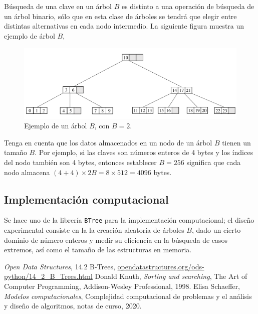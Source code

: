 \documentclass[letterpaper,11pt]{article}
\begin{document}
Búsqueda de una clave en un árbol $B$ es distinto a una operación de búsqueda de un árbol binario, sólo que en esta clase de árboles se tendrá que elegir entre distintas alternativas en cada nodo intermedio. La siguiente figura muestra un ejemplo de árbol $B$,

\begin{figure}[h!]
  \centering
  \includegraphics[width=\textwidth]{img/btree.pdf}
  \caption{Ejemplo de un árbol $B$, con $B=2$.}
  \label{fig:ie}
\end{figure}

Tenga en cuenta que los datos almacenados en un nodo de un árbol $B$ tienen un tamaño $B$. Por ejemplo, si las claves son números enteros de 4 bytes y los índices del nodo también son 4 bytes, entonces establecer $ B=256 $ significa que cada nodo almacena $\displaystyle (4+4)\times 2B= 8\times512=4096$ bytes.

\subsection{Implementación computacional}

Se hace uno de la librería \texttt{BTree} para la implementación computacional; el diseño experimental consiste en la la creación aleatoria de árboles $B$, dado un cierto dominio de número enteros y medir su eficiencia en la búsqueda de casos extremos, así como el tamaño de las estructuras en memoria.
 

\begin{thebibliography}{0}
  \textit{Open Data Structures}, 14.2 B-Trees, \url{opendatastructures.org/ods-python/14_2_B_Trees.html}
   Donald Knuth, \textit{Sorting and searching}, The Art of Computer Programming, Addison-Wesley Professional, 1998.
   Elisa Schaeffer, \textit{Modelos computacionales}, Complejidad computacional de problemas y el análisis y diseño de algoritmos, notas de curso, 2020.
\end{thebibliography}
\end{document}
